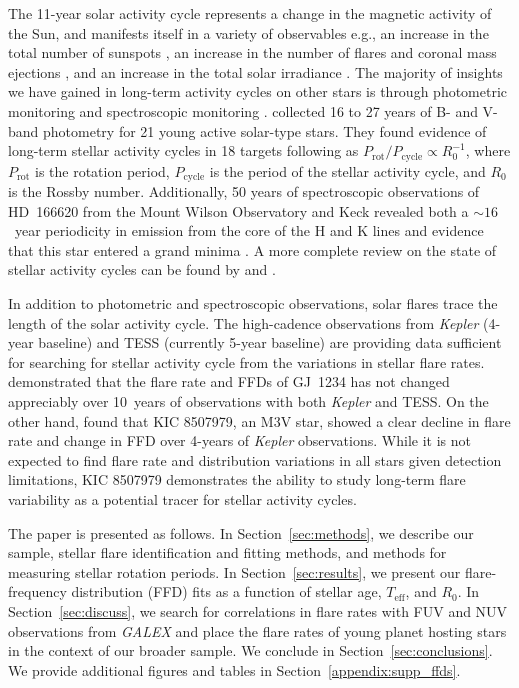 \documentclass[twocolumn]{aastex631}
\begin{document}
The 11-year solar activity cycle represents a change in the magnetic activity of the Sun, and manifests itself in a variety of observables e.g., an increase in the total number of sunspots \citep{clette14, kilcik14}, an increase in the number of flares and coronal mass ejections \citep{crossby93, webb94, lin23}, and an increase in the total solar irradiance \citep{lean1987}. The majority of insights we have gained in long-term activity cycles on other stars is through photometric monitoring and spectroscopic monitoring \citep{saar99}. \cite{lehtinen16} collected 16 to 27 years of B- and V-band photometry for 21 young active solar-type stars. They found evidence of long-term stellar activity cycles in 18 targets following as $P_\textrm{rot}/P_\textrm{cycle} \propto R_0^{-1}$, where $P_\textrm{rot}$ is the rotation period, $P_\textrm{cycle}$ is the period of the stellar activity cycle, and $R_0$ is the Rossby number. Additionally, 50 years of spectroscopic observations of HD~166620 from the Mount Wilson Observatory and Keck revealed both a $\sim 16$~year periodicity in emission from the core of the  H and K lines \citep{olah16} and evidence that this star entered a grand minima \citep{baum22}. A more complete review on the state of stellar activity cycles can be found by \cite{jeffers23} and \cite{isik23}.

In addition to photometric and spectroscopic observations, solar flares trace the length of the solar activity cycle. The high-cadence observations from \textit{Kepler} (4-year baseline) and TESS (currently 5-year baseline) are providing data sufficient for searching for stellar activity cycle from the variations in stellar flare rates. \cite{davenport20} demonstrated that the flare rate and FFDs of GJ~1234 has not changed appreciably over 10~years of observations with both \textit{Kepler} and TESS. On the other hand, \cite{scoggins19} found that  KIC 8507979, an M3V star, showed a clear decline in flare rate and change in FFD over 4-years of \textit{Kepler} observations. While it is not expected to find flare rate and distribution variations in all stars given detection limitations, KIC 8507979 demonstrates the ability to study long-term flare variability as a potential tracer for stellar activity cycles.

The paper is presented as follows. In Section~\ref{sec:methods}, we describe our sample, stellar flare identification and fitting methods, and methods for measuring stellar rotation periods. In Section~\ref{sec:results}, we present our flare-frequency distribution (FFD) fits as a function of stellar age, $T_\textrm{eff}$, and $R_0$. In Section~\ref{sec:discuss}, we search for correlations in flare rates with FUV and NUV observations from \textit{GALEX} and place the flare rates of young planet hosting stars in the context of our broader sample. We conclude in Section~\ref{sec:conclusions}. We provide additional figures and tables in Section~\ref{appendix:supp_ffds}.
\end{document}
